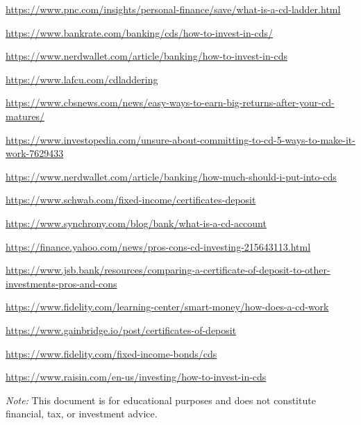 \documentclass[11pt]{article}
\begin{document}
\begin{enumerate}[label={[\arabic*]}]
  \item \url{https://www.pnc.com/insights/personal-finance/save/what-is-a-cd-ladder.html}
  \item \url{https://www.bankrate.com/banking/cds/how-to-invest-in-cds/}
  \item \url{https://www.nerdwallet.com/article/banking/how-to-invest-in-cds}
  \item \url{https://www.lafcu.com/cdladdering}
  \item \url{https://www.cbsnews.com/news/easy-ways-to-earn-big-returns-after-your-cd-matures/}
  \item \url{https://www.investopedia.com/unsure-about-committing-to-cd-5-ways-to-make-it-work-7629433}
  \item \url{https://www.nerdwallet.com/article/banking/how-much-should-i-put-into-cds}
  \item \url{https://www.schwab.com/fixed-income/certificates-deposit}
  \item \url{https://www.synchrony.com/blog/bank/what-is-a-cd-account}
  \item \url{https://finance.yahoo.com/news/pros-cons-cd-investing-215643113.html}
  \item \url{https://www.jsb.bank/resources/comparing-a-certificate-of-deposit-to-other-investments-pros-and-cons}
  \item \url{https://www.fidelity.com/learning-center/smart-money/how-does-a-cd-work}
  \item \url{https://www.gainbridge.io/post/certificates-of-deposit}
  \item \url{https://www.fidelity.com/fixed-income-bonds/cds}
  \item \url{https://www.raisin.com/en-us/investing/how-to-invest-in-cds}
\end{enumerate}

\vspace{1ex}
\noindent\textit{Note:} This document is for educational purposes and does not constitute financial, tax, or investment advice.
\end{document}
